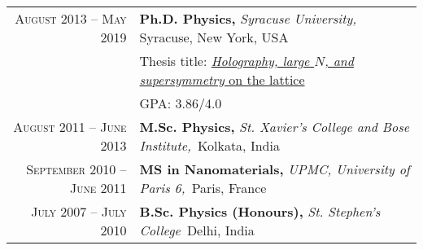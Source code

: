 \begin{tabular}{rl}	
	\textsc{August 2013 -- May 2019}  & \textbf{Ph.D. Physics,} \emph{Syracuse University,} Syracuse, New York, USA\\ 
									& Thesis title: \textcolor{blue}{\href{https://surface.syr.edu/etd/1003/}{\emph{Holography, large $N$, and \textit{supersymmetry}} on the lattice}} \\ 
									& \textsc{GPA:} 3.86/4.0\\
	\textsc{August 2011 -- June 2013} 	& \textbf{M.Sc. Physics,} \emph{St. Xavier's College and Bose Institute,}{~Kolkata, }{India} \\
	\textsc{September 2010 -- June 2011} 	& \textbf{MS in Nanomaterials,} \emph{UPMC, University of Paris 6,}{~Paris, }{France} \\
	\textsc{July 2007 -- July 2010} 	& \textbf{B.Sc. Physics (Honours),} \emph{St. Stephen's College}{~Delhi, }{India} \\	
\end{tabular}